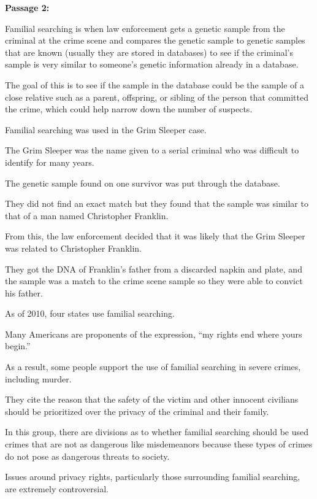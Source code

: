 \bigskip
\textbf{Passage 2:}

\bigskip
\begin{inparaenum}[\bfseries 1]
\indent \item Familial searching is when law enforcement gets a genetic sample from the criminal at the crime scene and compares the genetic sample to genetic samples that are known (usually they are stored in databases) to see if the criminal's sample is very similar to someone's genetic information already in a database. \item The goal of this is to see if the sample in the database could be the sample of a close relative such as a parent, offspring, or sibling of the person that committed the crime, which could help narrow down the number of suspects. \item Familial searching was used in the Grim Sleeper case. \item The Grim Sleeper was the name given to a serial criminal who was difficult to identify for many years. \item The genetic sample found on one survivor was put through the database. \item They did not find an exact match but they found that the sample was similar to that of a man named Christopher Franklin. \item From this, the law enforcement decided that it was likely that the Grim Sleeper was related to Christopher Franklin. \item They got the DNA of Franklin's father from a discarded napkin and plate, and the sample was a match to the crime scene sample so they were able to convict his father. 

\indent \item As of 2010, four states use familial searching. \item Many Americans are proponents of the expression, ``my rights end where yours begin.'' \item As a result, some people support the use of familial searching in severe crimes, including murder. \item They cite the reason that the safety of the victim and other innocent civilians should be prioritized over the privacy of the criminal and their family. \item In this group, there are divisions as to whether familial searching should be used crimes that are not as dangerous like misdemeanors because these types of crimes do not pose as dangerous threats to society. \item Issues around privacy rights, particularly those surrounding familial searching, are extremely controversial. 
\end{inparaenum}

